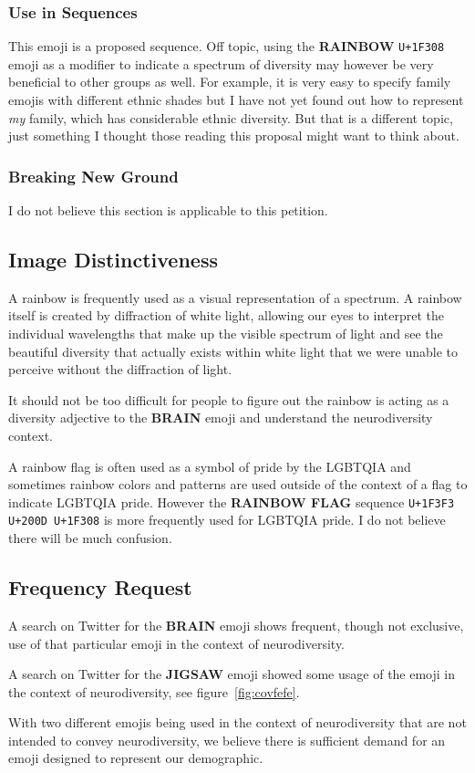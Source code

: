 \subsubsection{Use in Sequences}

This emoji is a proposed sequence. Off topic, using the \textbf{RAINBOW} \texttt{U+1F308} emoji as a modifier to indicate a spectrum of diversity may however be very beneficial to other groups as well. For example, it is very easy to specify family emojis with different ethnic shades but I have not yet found out how to represent \emph{my} family, which has considerable ethnic diversity. But that is a different topic, just something I thought those reading this proposal might want to think about.

\subsubsection{Breaking New Ground}

I do not believe this section is applicable to this petition.

\subsection{Image Distinctiveness}

A rainbow is frequently used as a visual representation of a spectrum. A rainbow itself is created by diffraction of white light, allowing our eyes to interpret the individual wavelengths that make up the visible spectrum of light and see the beautiful diversity that actually exists within white light that we were unable to perceive without the diffraction of light.

It should not be too difficult for people to figure out the rainbow is acting as a diversity adjective to the \textbf{BRAIN} emoji and understand the neurodiversity context.

A rainbow flag is often used as a symbol of pride by the LGBTQIA and sometimes rainbow colors and patterns are used outside of the context of a flag to indicate LGBTQIA pride. However the \textbf{RAINBOW FLAG} sequence \texttt{U+1F3F3 U+200D U+1F308} is more frequently used for LGBTQIA pride. I do not believe there will be much confusion.

\subsection{Frequency Request}

A search on Twitter for the \textbf{BRAIN} emoji shows frequent, though not exclusive, use of that particular emoji in the context of neurodiversity.

A search on Twitter for the \textbf{JIGSAW} emoji showed some usage of the emoji in the context of neurodiversity, see figure~\ref{fig:covfefe}.

With two different emojis being used in the context of neurodiversity that are not intended to convey neurodiversity, we believe there is sufficient demand for an emoji designed to represent our demographic.
